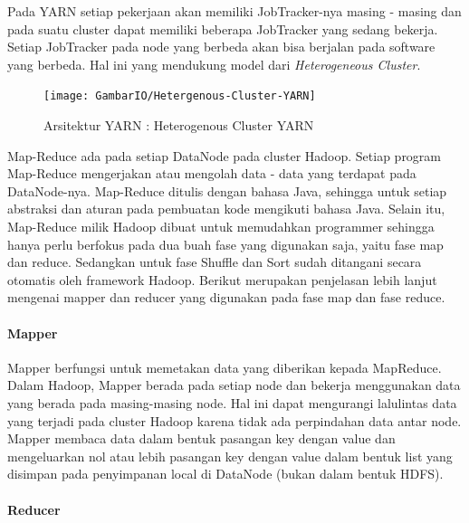 Pada YARN setiap pekerjaan akan memiliki JobTracker-nya masing - masing dan pada suatu cluster dapat memiliki beberapa JobTracker yang sedang bekerja. Setiap JobTracker pada node yang berbeda akan bisa berjalan pada software yang berbeda. Hal ini yang mendukung model  dari \textit{Heterogeneous Cluster}.


\begin{figure}[h]
	\centering
	\texttt{[image: GambarIO/Hetergenous-Cluster-YARN]}
	\caption[Arsitektur YARN]{Arsitektur YARN : Heterogenous Cluster YARN}
	\label{fig:Arsitektur YARN : Heterogenous Cluster YARN}
\end{figure}


Map-Reduce ada pada setiap DataNode pada cluster Hadoop. Setiap program Map-Reduce mengerjakan atau mengolah data - data yang terdapat pada DataNode-nya. Map-Reduce ditulis dengan bahasa Java, sehingga untuk setiap abstraksi dan aturan pada pembuatan kode mengikuti bahasa Java. Selain itu, Map-Reduce milik Hadoop dibuat untuk memudahkan programmer sehingga hanya perlu berfokus pada dua buah fase yang digunakan saja, yaitu fase map dan reduce. Sedangkan untuk fase Shuffle dan Sort sudah ditangani secara otomatis oleh framework Hadoop. Berikut merupakan penjelasan lebih lanjut mengenai mapper dan reducer yang digunakan pada fase map dan fase reduce.

\paragraph{Mapper} 

Mapper berfungsi untuk memetakan data yang diberikan kepada MapReduce. Dalam Hadoop, Mapper berada pada setiap node dan bekerja menggunakan data yang berada pada masing-masing node. Hal ini dapat mengurangi lalulintas data yang terjadi pada cluster Hadoop karena tidak ada perpindahan data antar node. Mapper membaca data dalam bentuk pasangan key dengan value dan mengeluarkan nol atau lebih pasangan key dengan value dalam bentuk list yang disimpan pada penyimpanan local di DataNode (bukan dalam bentuk HDFS).

\paragraph{Reducer}

